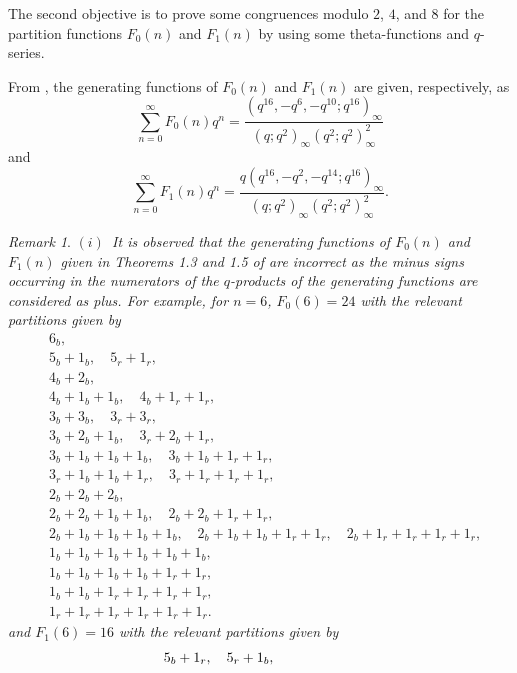 \documentclass[12pt]{article}
\numberwithin{equation}{section}
\theoremstyle{definition}
\theoremstyle{remark}
\newtheorem{remark}[theorem]{Remark}
\numberwithin{equation}{section}
\begin{document}
The second objective is to prove some congruences modulo \( 2\), \( 4\),  and \( 8 \)  for the partition functions  \( F_0(n) \) and \( F_1(n) \) by using some theta-functions and \( q \)-series. 

From \cite[Theorems 1 and 2]{arx}, the generating functions of \( F_0(n) \) and \( F_1(n) \) are given, respectively, as
\begin{equation}\label{I3}
	\sum_{n=0}^{\infty}F_0(n)q^n
	=
	\dfrac{(q^{16},-q^6,-q^{10};q^{16})_\infty}
	{(q;q^2)_\infty(q^2;q^2)^2_\infty}
\end{equation}
and
\begin{equation}\label{I4}
	\sum_{n=0}^{\infty}F_1(n)q^n
	=
	\dfrac{q(q^{16},-q^2,-q^{14};q^{16})_\infty}
	{(q;q^2)_\infty(q^2;q^2)^2_\infty}.
\end{equation}
\begin{remark}\it
$(i)$~It is observed that the generating functions of \( F_0(n) \) and \( F_1(n) \) given in Theorems 1.3 and 1.5  of \cite[p. 2]{2clr} are incorrect as the minus signs occurring in the numerators of the $q$-products of the generating functions are considered as plus. For example, for $n=6$,  $F_0(6)=24$ with the relevant partitions given by 
\begin{align*}
	&6_b,\\
	&5_b+1_b,\quad 5_r+1_r,\\
	&4_b+2_b,\\
	&4_b+1_b+1_b,\quad 4_b+1_r+1_r,\\
	&3_b+3_b,\quad 3_r+3_r,\\
	&3_b+2_b+1_b,\quad 3_r+2_b+1_r,\\
	&3_b+1_b+1_b+1_b,\quad 3_b+1_b+1_r+1_r,\\
	&3_r+1_b+1_b+1_r,\quad 3_r+1_r+1_r+1_r,\\
	&2_b+2_b+2_b,\\
	&2_b+2_b+1_b+1_b,\quad 2_b+2_b+1_r+1_r,\\
	&2_b+1_b+1_b+1_b+1_b,\quad
	2_b+1_b+1_b+1_r+1_r,\quad
	2_b+1_r+1_r+1_r+1_r,\\
	&1_b+1_b+1_b+1_b+1_b+1_b,\\
	&1_b+1_b+1_b+1_b+1_r+1_r,\\
	&1_b+1_b+1_r+1_r+1_r+1_r,\\
	&1_r+1_r+1_r+1_r+1_r+1_r.
\end{align*}
 and $F_1(6)=16$ with the relevant partitions given by 
\begin{align*}
	\hspace{-2.1cm}&5_b+1_r,\quad 5_r+1_b,\\

\end{align*}
\end{remark}
\end{document}
